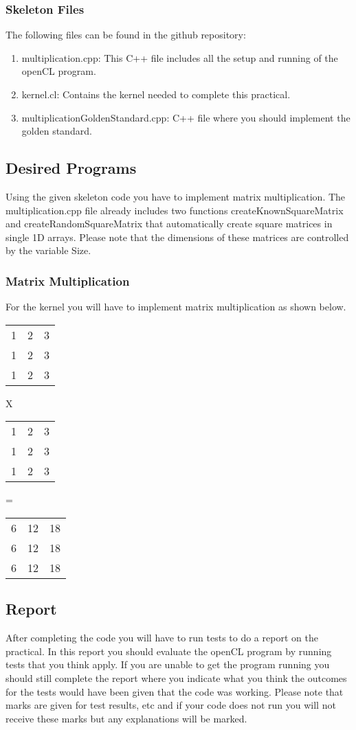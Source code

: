 \subsubsection{Skeleton Files}
The following files can be found in the github repository:
\begin{enumerate}
    \item multiplication.cpp: This C++ file includes all the setup and running of the openCL program.
    \item kernel.cl: Contains the kernel needed to complete this practical.
    \item multiplicationGoldenStandard.cpp: C++ file where you should implement the golden standard.
\end{enumerate}

\subsection{Desired Programs}
Using the given skeleton code you have to implement matrix multiplication. The multiplication.cpp file already includes two functions createKnownSquareMatrix and createRandomSquareMatrix that automatically create square matrices in single 1D arrays. Please note that the dimensions of these matrices are controlled by the variable Size.

\subsubsection{Matrix Multiplication}
For the kernel you will have to implement matrix multiplication as shown below.

\begin{tabular}{ c c c }
1 & 2 & 3\\
1 & 2 & 3\\
1 & 2 & 3
\end{tabular}
X
\begin{tabular}{ c c c }
1 & 2 & 3\\
1 & 2 & 3\\
1 & 2 & 3
\end{tabular}
 = 
\begin{tabular}{ c c c }
6 & 12 & 18\\
6 & 12 & 18\\
6 & 12 & 18
\end{tabular}

\subsection{Report}
After completing the code you will have to run tests to do a report on the practical. In this report you should evaluate the openCL program by running tests that you think apply. If you are unable to get the program running you should still complete the report where you indicate what you think the outcomes for the tests would have been given that the code was working. Please note that marks are given for test results, etc and if your code does not run you will not receive these marks but any explanations will be marked.

